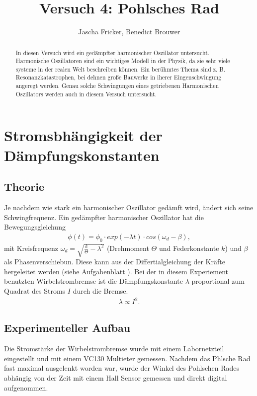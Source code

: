 \documentclass[11pt, a4paper]{article}
\title{Versuch 4: Pohlsches Rad}
\author{Jascha Fricker, Benedict Brouwer}
\begin{document}
    \maketitle

    

    \begin{abstract}
        In diesen Versuch wird ein gedämpfter harmonischer Oszillator untersucht. Harmonische Oszillatoren
        sind ein wichtiges Modell in der Physik, da sie sehr viele systeme in der realen Welt beschreiben können.
        Ein berühmtes Thema sind z. B. Resonanzkatastrophen, bei dehnen große Bauwerke in iherer Eingenschwingung
        angeregt werden. Genau solche Schwingungen eines getriebenen Harmonischen Oszillators werden auch in diesem
        Versuch untersucht.
    \end{abstract}

    \tableofcontents

    \newpage

    \section{Stromsbhängigkeit der Dämpfungskonstanten}
    \subsection{Theorie}
    Je nachdem wie stark ein harmonischer Oszillator gedämft wird, ändert sich seine Schwingfrequenz.
    Ein gedämpfter harmonischer Oszillator hat die Bewegungsgleichung
    \begin{align}
        \phi(t) = \phi_0 \cdot exp(-\lambda t) \cdot cos(\omega_d - \beta), \label{theo5}
    \end{align}
    mit Kreisfrequenz $\omega_d = \sqrt{\frac{k}{\Theta} - \lambda^2}$ (Drehmoment $\Theta$ und Federkonstante $k$)
    und $\beta$ als Phasenverschiebun. Diese kann aus der Differtialgleichung der Kräfte 
    hergeleitet werden (siehe Aufgabenblatt \cite[(5)]{POR}).
    Bei der in diesem Experiement benutzten Wirbelstrombremse ist die
    Dämpfungskonstante $\lambda$ proportional zum Quadrat des Stroms $I$ durch die Bremse.
    \begin{align}
        \lambda \propto I^2.
    \end{align}

    \subsection{Experimenteller Aufbau}
    Die Stromstärke der Wirbelstrombremse wurde mit einem Labornetzteil eingestellt und
    mit einem VC130 Multieter gemessen. Nachdem das Phlsche Rad fast maximal ausgelenkt worden war, 
    wurde der Winkel des Pohlschen Rades abhängig von der Zeit
    mit einem Hall Sensor gemessen und direkt digital aufgenommen.
\end{document}
